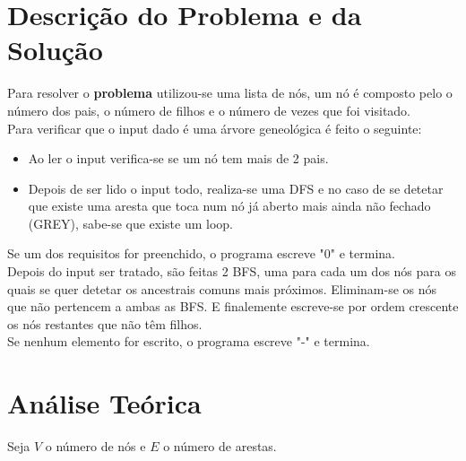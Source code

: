 \documentclass[12pt,a4paper]{article}
\begin{document}
  \section{Descrição do Problema e da Solução}

  Para resolver o \textbf{problema} utilizou-se uma lista de nós, um nó é composto pelo o número dos pais, o número de filhos e o número de vezes que foi visitado.\\
  Para verificar que o input dado é uma árvore geneológica é feito o seguinte:
  
  \begin{itemize}
    \setlength{\itemsep}{0pt}
      \item Ao ler o input verifica-se se um nó tem mais de 2 pais.
      \item Depois de ser lido o input todo, realiza-se uma DFS e no caso de se detetar que existe uma aresta que toca num nó já aberto mais ainda não fechado (GREY), sabe-se que existe um loop.
  \end{itemize}
  Se um dos requisitos for preenchido, o programa escreve "0" e termina.\\
  Depois do input ser tratado, são feitas 2 BFS, uma para cada um dos nós para os quais se quer detetar os ancestrais comuns mais próximos.
  Eliminam-se os nós que não pertencem a ambas as BFS.
  E finalemente escreve-se por ordem crescente os nós restantes que não têm filhos.\\
 Se nenhum elemento for escrito, o programa escreve "-" e termina.

  \section{Análise Teórica}

  Seja $V$ o número de nós e $E$ o número de arestas.
\end{document}

